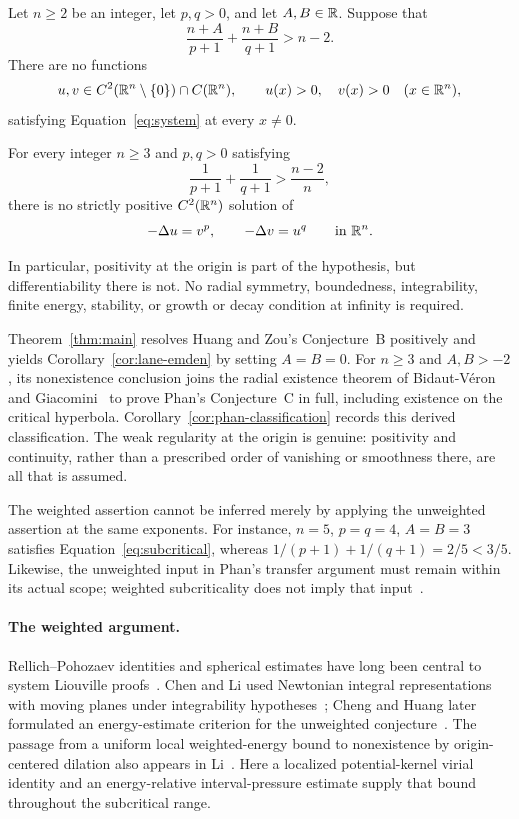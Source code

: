 \begin{theorem}\label{thm:main}
Let \(n\ge2\) be an integer, let \(p,q>0\), and let \(A,B\in\mathbb R\).
Suppose that
\begin{equation}\label{eq:subcritical}
 \frac{n+A}{p+1}+\frac{n+B}{q+1}>n-2.
\end{equation}
There are no functions
\[
 u,v\in C^2(\mathbb R^n\setminus\{0\})\cap C(\mathbb R^n),
 \qquad u(x)>0,\quad v(x)>0\quad(x\in\mathbb R^n),
\]
satisfying Equation~\eqref{eq:system} at every \(x\ne0\).
\end{theorem}

\begin{corollary}
\label{cor:lane-emden}
For every integer \(n\ge3\) and \(p,q>0\) satisfying
\[
 \frac{1}{p+1}+\frac{1}{q+1}>\frac{n-2}{n},
\]
there is no strictly positive \(C^2(\mathbb R^n)\) solution of
\[
 -\Delta u=v^p,\qquad -\Delta v=u^q\qquad\text{in }\mathbb R^n.
\]
\end{corollary}

In particular, positivity at the origin is part of the hypothesis,
but differentiability there is not. No radial symmetry, boundedness,
integrability, finite energy, stability, or growth or decay condition
at infinity is required.

Theorem~\ref{thm:main} resolves Huang and Zou's Conjecture~B positively
and yields Corollary~\ref{cor:lane-emden} by setting \(A=B=0\).
For \(n\ge3\) and \(A,B>-2\), its nonexistence conclusion joins the
radial existence theorem of Bidaut-V\'eron and
Giacomini~\cite[Theorem~1.4(i)]{BidautVeronGiacomini2010} to prove Phan's
Conjecture~C in full, including existence on the critical hyperbola.
Corollary~\ref{cor:phan-classification} records this derived classification.
The weak regularity at the origin is genuine: positivity and continuity,
rather than a prescribed order of vanishing or smoothness there, are all
that is assumed.

The weighted assertion cannot be inferred merely by applying the
unweighted assertion at the same exponents. For instance,
\(n=5\), \(p=q=4\), \(A=B=3\) satisfies
Equation~\eqref{eq:subcritical}, whereas
\(1/(p+1)+1/(q+1)=2/5<3/5\).
Likewise, the unweighted input in Phan's transfer argument must remain
within its actual scope; weighted subcriticality does not imply that
input~\cite{Phan}.

\paragraph{The weighted argument.}
Rellich--Pohozaev identities and spherical estimates have long been
central to system Liouville proofs~\cite{Mitidieri1993,Souplet2009,Phan}.
Chen and Li used Newtonian integral representations with moving planes
under integrability hypotheses~\cite{ChenLi2009}; Cheng and Huang later
formulated an energy-estimate criterion for the unweighted
conjecture~\cite{ChengHuang2019}. The passage from a uniform local
weighted-energy bound to nonexistence by origin-centered dilation also
appears in Li~\cite[Section~2]{Li2022}. Here a localized potential-kernel
virial identity and an energy-relative interval-pressure estimate supply
that bound throughout the subcritical range.

